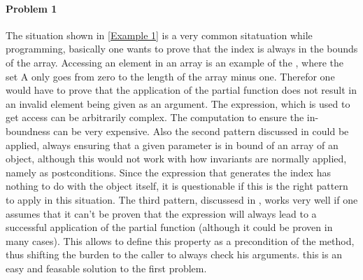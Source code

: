 \paragraph{Problem 1}
The situation shown in \ref{Example 1} is a very common sitatuation while programming, basically one wants to prove that the index is always in the bounds of the array. Accessing an element in an array is an example of the , where the set A only goes from zero to the length of the array minus one. Therefor one would have to prove that the application of the partial function does not result in an invalid element being given as an argument. The expression, which is used to get access can be arbitrarily complex. The computation to ensure the in-boundness can be very expensive.  \newline
Also the second pattern discussed in  could be applied, always ensuring that a given parameter is in bound of an array of an object, although this would not work with how invariants are normally applied, namely as postconditions. Since the expression that generates the index has nothing to do with the object itself, it is questionable if this is the right pattern to apply in this situation. \newline
The third pattern, discussesd in , works very well if one assumes that it can't be proven that the expression will always lead to a successful application of the partial function (although it could be proven in many cases). This allows to define this property as a precondition of the method, thus shifting the burden to the caller to always check his arguments. this is an easy and feasable solution to the first problem. 

